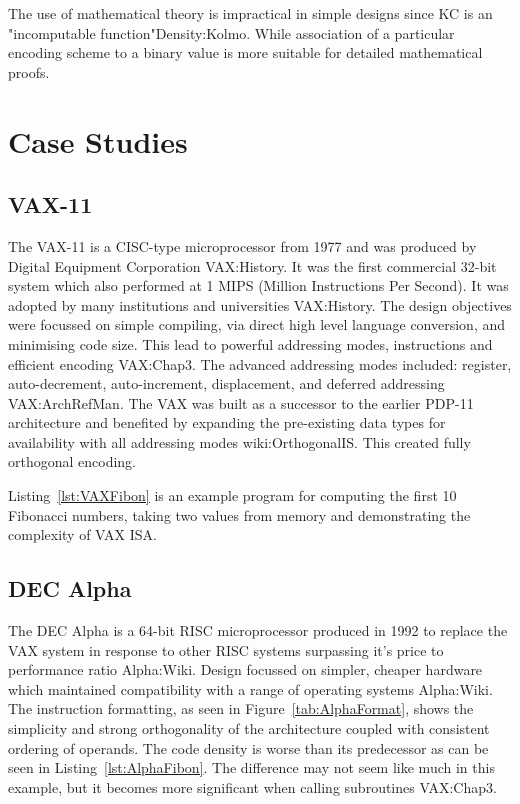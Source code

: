 \documentclass[12pt,a4paper]{article}
\begin{document}
The use of mathematical theory is impractical in simple designs since KC is an "incomputable function"\cite{ref}{Density:Kolmo}. While association of a particular encoding scheme to a binary value is more suitable for detailed mathematical proofs.

\section{Case Studies}

\subsection{VAX-11}
The VAX-11 is a CISC-type microprocessor from 1977 and was produced by Digital Equipment Corporation \cite{ref}{VAX:History}. It was the first commercial 32-bit system which also performed at 1 MIPS (Million Instructions Per Second). It was adopted by many institutions and universities \cite{ref}{VAX:History}. The design objectives were focussed on simple compiling, via direct high level language conversion, and minimising code size. This lead to powerful addressing modes, instructions and efficient encoding \cite{ref}{VAX:Chap3}. The advanced addressing modes included: register, auto-decrement, auto-increment, displacement, and deferred addressing \cite{ref}{VAX:ArchRefMan}. The VAX was built as a successor to the earlier PDP-11 architecture and benefited by expanding the pre-existing data types for availability with all addressing modes \cite{ref}{wiki:OrthogonalIS}. This created fully orthogonal encoding. 

Listing~\ref{lst:VAXFibon} is an example program for computing the first 10 Fibonacci numbers, taking two values from memory and demonstrating the complexity of VAX ISA.

\newpage


\subsection{DEC Alpha}
The DEC Alpha is a 64-bit RISC microprocessor produced in 1992 to replace the VAX system in response to other RISC systems surpassing it's price to performance ratio \cite{ref}{Alpha:Wiki}. Design focussed on simpler, cheaper hardware which maintained compatibility with a range of operating systems \cite{ref}{Alpha:Wiki}. The instruction formatting, as seen in Figure~\ref{tab:AlphaFormat}, shows the simplicity and strong orthogonality of the architecture coupled with consistent ordering of operands. The code density is worse than its predecessor as can be seen in Listing~\ref{lst:AlphaFibon}. The difference may not seem like much in this example, but it becomes more significant when calling subroutines \cite{ref}{VAX:Chap3}. 
\end{document}
